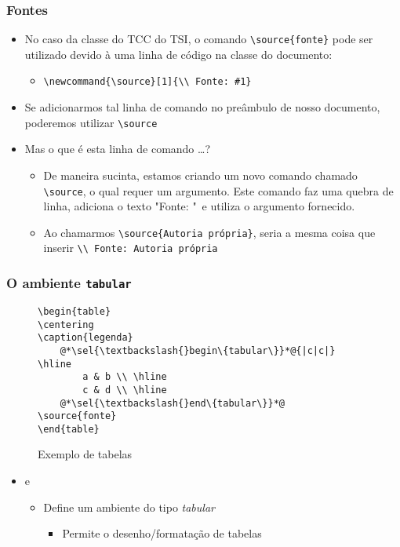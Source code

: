 \begin{frame}[fragile,label={slide:floatjustsource}] \frametitle{Fontes}
\begin{itemize}
	\item No caso da classe do TCC do TSI, o comando \texttt{\textbackslash{}source\{fonte\}} pode ser utilizado devido à uma linha de código na classe do documento:
	\begin{itemize}
		\item \texttt{\textbackslash{}newcommand\{\textbackslash{}source\}[1]\{\textbackslash{}\textbackslash{} Fonte: \#1\}}
	\end{itemize}
	\item Se adicionarmos tal linha de comando no preâmbulo de nosso documento, poderemos utilizar \texttt{\textbackslash{}source}
	\item Mas o que é esta linha de comando \ldots?
	\begin{itemize}
		\item De maneira sucinta, estamos criando um novo comando chamado \texttt{\textbackslash{}source}, o qual requer um argumento. Este comando faz uma quebra de linha, adiciona o texto "Fonte: "~e utiliza o argumento fornecido.
		\item Ao chamarmos \texttt{\textbackslash{}source\{Autoria própria\}}, seria a mesma coisa que inserir \texttt{{\textbackslash{}\textbackslash{} Fonte: Autoria própria}}
		\end{itemize}	
	\end{itemize}
\end{frame}

\begin{frame}[fragile] \frametitle{O ambiente \texttt{tabular}}
\vspace{-0.5cm}
\begin{figure}[!t]
\caption{Exemplo de tabelas}
\begin{lstlisting}
\begin{table}
\centering
\caption{legenda}
	@*\sel{\textbackslash{}begin\{tabular\}}*@{|c|c|} \hline
		a & b \\ \hline
		c & d \\ \hline
	@*\sel{\textbackslash{}end\{tabular\}}*@
\source{fonte}
\end{table}
\end{lstlisting}
\ownsrc
\end{figure}

\begin{itemize}
	\item {} e 
	\begin{itemize}
		\item Define um ambiente do tipo \textit{tabular}
		\begin{itemize}
			\item Permite o desenho/formatação de tabelas
		\end{itemize}
	\end{itemize}
\end{itemize}
\end{frame}

